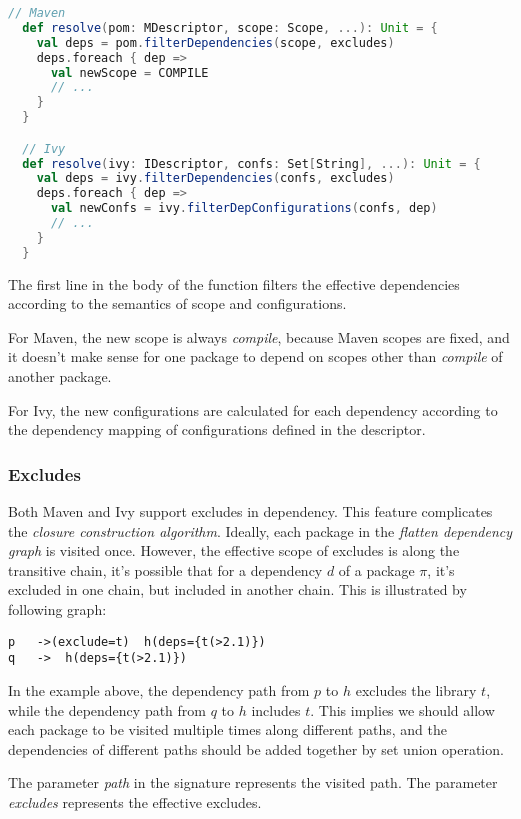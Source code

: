 \begin{lstlisting}[language=Scala]
  // Maven
  def resolve(pom: MDescriptor, scope: Scope, ...): Unit = {
    val deps = pom.filterDependencies(scope, excludes)
    deps.foreach { dep =>
      val newScope = COMPILE
      // ...
    }
  }

  // Ivy
  def resolve(ivy: IDescriptor, confs: Set[String], ...): Unit = {
    val deps = ivy.filterDependencies(confs, excludes)
    deps.foreach { dep =>
      val newConfs = ivy.filterDepConfigurations(confs, dep)
      // ...
    }
  }
\end{lstlisting}

The first line in the body of the function filters the effective dependencies according to the semantics of scope and configurations.

For Maven, the new scope is always \emph{compile}, because Maven scopes are fixed, and it doesn't make sense for one package to depend on scopes other than \emph{compile} of another package.

For Ivy, the new configurations are calculated for each dependency according to the dependency mapping of configurations defined in the descriptor.

\subsubsection{Excludes}

Both Maven and Ivy support excludes in dependency. This feature complicates the \emph{closure construction algorithm}. Ideally, each package in the \emph{flatten dependency graph} is visited once. However, the effective scope of excludes is along the transitive chain, it's possible that for a dependency $d$ of a package $\pi$, it's excluded in one chain, but included in another chain. This is illustrated by following graph:

\begin{verbatim}
p   ->(exclude=t)  h(deps={t(>2.1)})
q   ->  h(deps={t(>2.1)})
\end{verbatim}

In the example above, the dependency path from $p$ to $h$ excludes the library $t$, while the dependency path from $q$ to $h$ includes $t$. This implies we should allow each package to be visited multiple times along different paths, and the dependencies of different paths should be added together by set union operation.

The parameter \emph{path} in the signature represents the visited path. The parameter \emph{excludes} represents the effective excludes.

